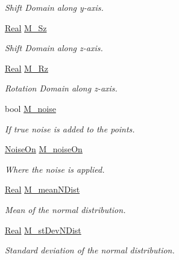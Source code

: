 \begin{DoxyCompactItemize}
\begin{DoxyCompactList}\small\item\em Shift Domain along y-\/axis. \end{DoxyCompactList}\item 
\hyperlink{namespaceFVCode3D_a40c1f5588a248569d80aa5f867080e83}{Real} \hyperlink{classFVCode3D_1_1Data_af6d969081d817b510c19401baa80593f}{M\+\_\+\+Sz}
\begin{DoxyCompactList}\small\item\em Shift Domain along z-\/axis. \end{DoxyCompactList}\item 
\hyperlink{namespaceFVCode3D_a40c1f5588a248569d80aa5f867080e83}{Real} \hyperlink{classFVCode3D_1_1Data_a1268778a4b4532d5760a4bfe5eb97e6f}{M\+\_\+\+Rz}
\begin{DoxyCompactList}\small\item\em Rotation Domain along z-\/axis. \end{DoxyCompactList}\item 
bool \hyperlink{classFVCode3D_1_1Data_a06f828cdc7dc1c3b4ea60b40f390333e}{M\+\_\+noise}
\begin{DoxyCompactList}\small\item\em If true noise is added to the points. \end{DoxyCompactList}\item 
\hyperlink{classFVCode3D_1_1Data_a983fdc14aa355a7c9fd614b9655a3552}{Noise\+On} \hyperlink{classFVCode3D_1_1Data_a82362848d9cced52dc04f50aeb0c9323}{M\+\_\+noise\+On}
\begin{DoxyCompactList}\small\item\em Where the noise is applied. \end{DoxyCompactList}\item 
\hyperlink{namespaceFVCode3D_a40c1f5588a248569d80aa5f867080e83}{Real} \hyperlink{classFVCode3D_1_1Data_aa9b032547f332b068770fa4eebe44462}{M\+\_\+mean\+N\+Dist}
\begin{DoxyCompactList}\small\item\em Mean of the normal distribution. \end{DoxyCompactList}\item 
\hyperlink{namespaceFVCode3D_a40c1f5588a248569d80aa5f867080e83}{Real} \hyperlink{classFVCode3D_1_1Data_a03ec8d7e05410e0966e4380c84a4dc6a}{M\+\_\+st\+Dev\+N\+Dist}
\begin{DoxyCompactList}\small\item\em Standard deviation of the normal distribution. \end{DoxyCompactList}\item 

\end{DoxyCompactItemize}
